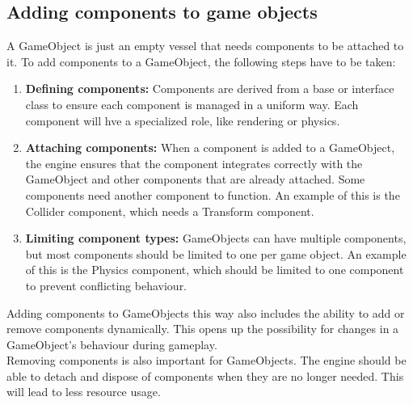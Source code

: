 \subsection{Adding components to game objects}
A GameObject is just an empty vessel that needs components to be attached to it.
To add components to a GameObject, the following steps have to be taken:
\begin{enumerate}
      \item \textbf{Defining components:}
            Components are derived from a base or interface class to ensure each component is managed in a uniform way.
            Each component will hve a specialized role, like rendering or physics.
      \item \textbf{Attaching components:}
            When a component is added to a GameObject, the engine ensures that the component integrates correctly with 
            the GameObject and other components that are already attached. Some components need another component to function.
            An example of this is the Collider component, which needs a Transform component.
      \item \textbf{Limiting component types:}
            GameObjects can have multiple components, but most components should be limited to one per game object.
            An example of this is the Physics component, which should be limited to one component to prevent conflicting behaviour.
\end{enumerate}

\noindent Adding components to GameObjects this way also includes the ability to add or remove components dynamically.
This opens up the possibility for changes in a GameObject's behaviour during gameplay.
\\
Removing components is also important for GameObjects.
The engine should be able to detach and dispose of components when they are no longer needed.
This will lead to less resource usage.